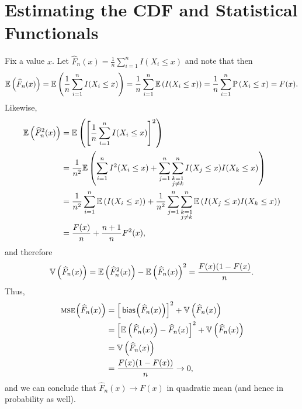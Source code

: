 \chapter{Estimating the CDF and Statistical Functionals}

\begin{ex}
  Fix a value $x$.
  Let $\widehat{F}_n(x)=\frac{1}{n}\sum_{i=1}^nI(X_i\leq x)$ and note that then
  \[
    \mathbb{E}\left(\widehat{F}_n(x)\right)
    =\mathbb{E}\left(\frac{1}{n}\sum_{i=1}^nI(X_i\leq x)\right)
    =\frac{1}{n}\sum_{i=1}^n\mathbb{E}\left(I(X_i\leq x)\right)
    =\frac{1}{n}\sum_{i=1}^n\mathbb{P}\left(X_i\leq x\right)
    =F(x).
  \]
  Likewise,
  \begin{align*}
    \mathbb{E}\left(\widehat{F}^2_n(x)\right)
     & =\mathbb{E}\left(\left[\frac{1}{n}\sum_{i=1}^nI(X_i\leq x)\right]^2\right) \\
     & =\frac{1}{n^2}\mathbb{E}\left(\sum_{i=1}^nI^2(X_i\leq x)
      +\sum_{j=1}^n\sum_{\substack{k = 1                       \\ j \neq k}}^nI(X_j\leq x)I(X_k\leq x)\right)                                                          \\
     & =\frac{1}{n^2}\sum_{i=1}^n\mathbb{E}\left(I(X_i\leq x)\right)
    +\frac{1}{n^2}\sum_{j=1}^n\sum_{\substack{k = 1            \\ j \neq k}}^n\mathbb{E}\left(I(X_j\leq x)I(X_k\leq x)\right)                                                          \\
     & =\frac{F(x)}{n}+\frac{n+1}{n}F^2(x),
  \end{align*}
  and therefore
  \[
    \mathbb{V}\left(\widehat{F}_n(x)\right)
    =\mathbb{E}\left(\widehat{F}^2_n(x)\right)-\mathbb{E}\left(\widehat{F}_n(x)\right)^2
    =\frac{F(x)(1-F(x)}{n}.
  \]
  Thus,
  \begin{align*}
    \,\textsc{mse}\mkern-2mu\left(\widehat{F}_n(x) \right)
     & =\left[\,\textsf{bias}\mkern-2mu\left(\widehat{F}_n(x) \right)\right]^2+\mathbb{V}\left(\widehat{F}_n(x)\right)               \\
     & =\left[\mathbb{E}\left(\widehat{F}_n(x)\right)-\widehat{F}_n(x)\right]^2+\mathbb{V}\left(\widehat{F}_n(x)\right) \\
     & =\mathbb{V}\left(\widehat{F}_n(x)\right)                                                      \\
     & =\frac{F(x)(1-F(x))}{n}\to 0,
  \end{align*}
  and we can conclude that $\widehat{F}_n(x)\to F(x)$ in quadratic mean (and
  hence in probability as well).
\end{ex}

